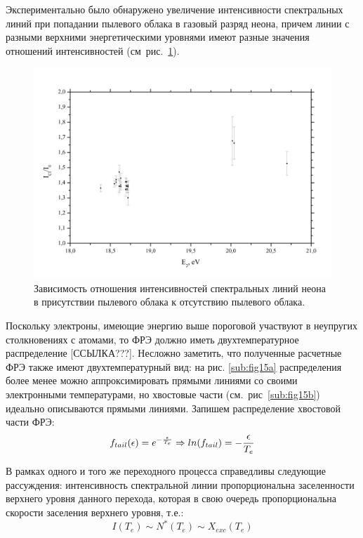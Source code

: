 Экспериментально было обнаружено увеличение интенсивности спектральных линий при попадании пылевого облака
в газовый разряд неона, причем линии с разными верхними энергетическими уровнями имеют разные значения
отношений интенсивностей (см~рис.~\ref{fig:fig35}).
\begin{figure}
    \centering
    \includegraphics[width=15cm]{figures/fig35}
    \caption{Зависимость отношения интенсивностей спектральных линий неона в присутствии пылевого облака к отсутствию пылевого облака.}
    \label{fig:fig35}
\end{figure}



Поскольку электроны, имеющие энергию выше пороговой участвуют в неупругих столкновениях с атомами, то ФРЭ должно иметь
двухтемпературное распределение [ССЫЛКА???]. Несложно заметить, что полученные расчетные ФРЭ также имеют двухтемпературный вид:
на рис. {\ref{sub:fig15a}} распределения более менее можно аппроксимировать прямыми линиями со своими электронными
температурами, но хвостовые части (см.~рис~\ref{sub:fig15b}) идеально описываются прямыми линиями. Запишем распределение хвостовой части ФРЭ:
\begin{equation}
    f_{tail}(\epsilon) = e^{-{\epsilon \over T_e}} \Rightarrow ln(f_{tail}) = - {\epsilon \over T_e}
    \label{eq:tail}
\end{equation}

В рамках одного и того же переходного процесса справедливы следующие рассуждения: интенсивность
спектральной линии пропорциональна заселенности верхнего уровня данного перехода, которая в свою очередь
пропорциональна скорости заселения верхнего уровня, т.е.:
\begin{equation}
I(T_e) \sim N^*(T_e) \sim X_{exc}(T_e)  %
\label{eq:sim_Te}
\end{equation}

